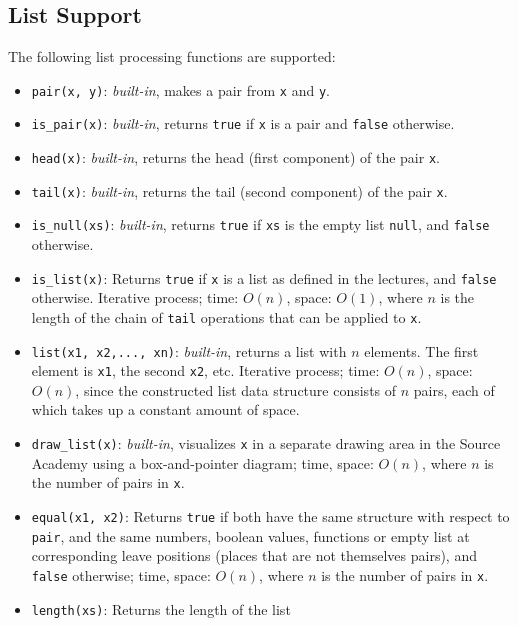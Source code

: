 \subsection*{List Support}

The following list processing functions are supported:

\begin{itemize}
\item \lstinline{pair(x, y)}: \textit{built-in}, makes a pair from \lstinline{x} and \lstinline{y}.
\item \lstinline{is_pair(x)}: \textit{built-in}, returns \lstinline{true} if \lstinline{x} is a
  pair and \lstinline{false} otherwise.
\item \lstinline{head(x)}: \textit{built-in}, returns the head (first component) of the pair \lstinline{x}.
\item \lstinline{tail(x)}: \textit{built-in}, returns the tail (second component) of the
  pair \lstinline{x}.
\item \lstinline{is_null(xs)}: \textit{built-in}, returns \lstinline{true} if \lstinline{xs} is the
  empty list \lstinline{null}, and \lstinline{false} otherwise.
\item \lstinline{is_list(x)}: Returns \lstinline{true} if
  \lstinline{x} is a list as defined in the lectures, and
  \lstinline{false} otherwise. Iterative process; 
time: $O(n)$, space: $O(1)$, where $n$ is the length of the 
chain of \lstinline{tail} operations that can be applied to \lstinline{x}.
\item \lstinline{list(x1, x2,..., xn)}: \textit{built-in}, returns a list with $n$ elements. The
first element is \lstinline{x1}, the second \lstinline{x2}, etc. Iterative
process; time: $O(n)$, space: $O(n)$, since the constructed list data structure
consists of $n$ pairs, each of which takes up a constant amount of space.
\item \lstinline{draw_list(x)}: \textit{built-in}, visualizes \lstinline{x} in a separate drawing
  area in the Source Academy using a box-and-pointer diagram; time, space:
  $O(n)$, where $n$ is the number of pairs in \lstinline{x}.
\item \lstinline{equal(x1, x2)}: Returns \lstinline{true} if both
  have the same structure with respect to \lstinline{pair},
  and the same numbers, boolean values, functions or empty list
  at corresponding leave positions (places that are not themselves pairs),
  and \lstinline{false} otherwise; time, space:
  $O(n)$, where $n$ is the number of pairs in \lstinline{x}.
\item \lstinline{length(xs)}: Returns the length of the list

\end{itemize}
